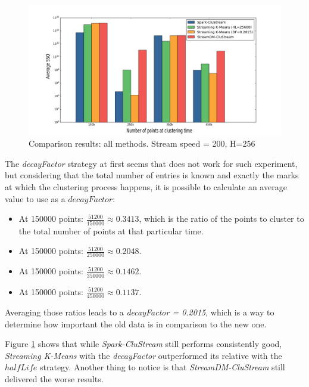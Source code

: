 \documentclass[10pt, conference, compsocconf]{IEEEtran}
\begin{document}
\begin{figure}[h!]
 \centering
 \includegraphics[scale=0.25]{./styles/comparison200.png}
 \caption{Comparison results: all methods. Stream speed = 200, H=256}
 \label{fig:comparison200}
\end{figure}

The \textit{decayFactor} strategy at first seems that does not work for such experiment, but considering that the total number of entries is known and exactly the marks at which the clustering process happens, it is possible to calculate an average value to use as a $decayFactor$: 

\begin{itemize}
 \item At 150000 points: $\frac{51200}{150000} \approx 0.3413$, which is the ratio of the points to cluster to the total number of points at that particular time.
 \item At 150000 points: $\frac{51200}{250000} \approx 0.2048$.
 \item At 150000 points: $\frac{51200}{350000} \approx 0.1462$.
 \item At 150000 points: $\frac{51200}{450000} \approx 0.1137$.
\end{itemize}

Averaging those ratios leads to a \textit{decayFactor = 0.2015}, which is a way to determine how important the old data is in comparison to the new one.


Figure \ref{fig:comparison200} shows that while \textit{Spark-CluStream} still performs consistently good, \textit{Streaming K-Means} with the \textit{decayFactor} outperformed its relative with the $halfLife$ strategy. Another thing to notice is that \textit{StreamDM-CluStream} still delivered the worse results. 
\end{document}
